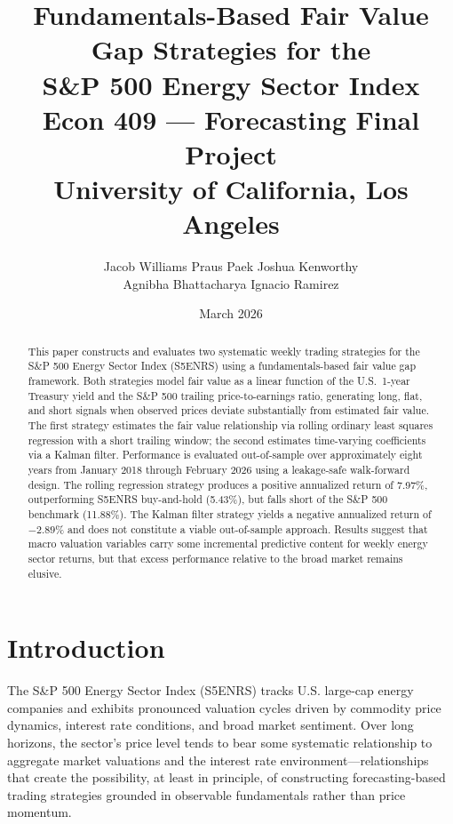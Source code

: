 \documentclass[12pt]{article}
\title{%
  \textbf{Fundamentals-Based Fair Value Gap Strategies for the\\
  S\&P 500 Energy Sector Index}\\[6pt]
  \large Econ 409 — Forecasting Final Project\\
  University of California, Los Angeles
}
\author{%
  Jacob Williams \quad Praus Paek \quad Joshua Kenworthy\\
  Agnibha Bhattacharya \quad Ignacio Ramirez
}
\date{March 2026}
\begin{document}
\maketitle
\thispagestyle{empty}

\begin{abstract}
This paper constructs and evaluates two systematic weekly trading strategies for the S\&P 500 Energy Sector Index (S5ENRS) using a fundamentals-based fair value gap framework. Both strategies model fair value as a linear function of the U.S.\ 1-year Treasury yield and the S\&P 500 trailing price-to-earnings ratio, generating long, flat, and short signals when observed prices deviate substantially from estimated fair value. The first strategy estimates the fair value relationship via rolling ordinary least squares regression with a short trailing window; the second estimates time-varying coefficients via a Kalman filter. Performance is evaluated out-of-sample over approximately eight years from January 2018 through February 2026 using a leakage-safe walk-forward design. The rolling regression strategy produces a positive annualized return of 7.97\%, outperforming S5ENRS buy-and-hold (5.43\%), but falls short of the S\&P 500 benchmark (11.88\%). The Kalman filter strategy yields a negative annualized return of $-2.89\%$ and does not constitute a viable out-of-sample approach. Results suggest that macro valuation variables carry some incremental predictive content for weekly energy sector returns, but that excess performance relative to the broad market remains elusive.
\end{abstract}

\newpage
\tableofcontents
\newpage

\section{Introduction}
\label{sec:intro}

The S\&P 500 Energy Sector Index (S5ENRS) tracks U.S. large-cap energy companies and exhibits pronounced valuation cycles driven by commodity price dynamics, interest rate conditions, and broad market sentiment. Over long horizons, the sector's price level tends to bear some systematic relationship to aggregate market valuations and the interest rate environment—relationships that create the possibility, at least in principle, of constructing forecasting-based trading strategies grounded in observable fundamentals rather than price momentum.
\end{document}

